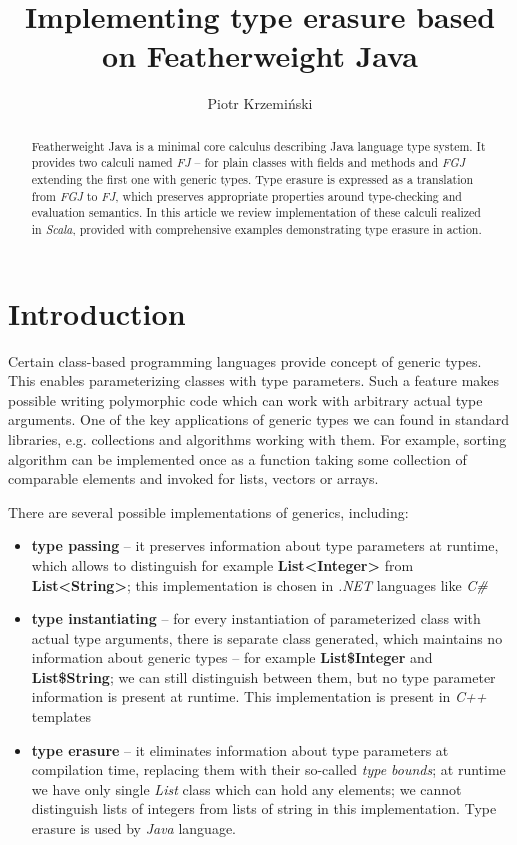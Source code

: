 \documentclass{article}[12pt]
\author{Piotr Krzemiński}
\title{Implementing type erasure based on Featherweight Java}
\date{}
\begin{document}
\maketitle


\begin{abstract}
Featherweight Java is a minimal core calculus describing Java language
type system. It provides two calculi named \emph{FJ} -- for plain
classes with fields and methods and \emph{FGJ} extending the first
one with generic types. Type erasure is expressed as a translation
from \emph{FGJ} to \emph{FJ}, which preserves appropriate properties
around type-checking and evaluation semantics. In this article
we review implementation of these calculi realized in \emph{Scala},
provided with comprehensive examples demonstrating type erasure in
action.
\end{abstract}


\section{Introduction}

Certain class-based programming languages provide concept of generic
types. This enables parameterizing classes with type parameters.
Such a feature makes possible writing polymorphic code which can
work with arbitrary actual type arguments. One of the key applications
of generic types we can found in standard libraries, e.g.
collections and algorithms working with them. For example,
sorting algorithm can be implemented once as a function taking some
collection of comparable elements and invoked for lists, vectors
or arrays.

There are several possible implementations of generics, including:

\begin{itemize}

\item{\textbf{type passing}} -- it preserves information about
  type parameters at runtime, which allows to distinguish
  for example \textbf{List<Integer>} from \textbf{List<String>}; 
  this implementation is chosen in \emph{.NET} languages like
  \emph{C\#}

\item{\textbf{type instantiating}} -- for every instantiation of
  parameterized class with actual type arguments, there is separate
  class generated, which maintains no information about generic
  types -- for example \textbf{List\$Integer} and \textbf{List\$String};
  we can still distinguish between them, but no type parameter
  information is present at runtime. This implementation is present
  in \emph{C++} templates

\item{\textbf{type erasure}} -- it eliminates information about
  type parameters at compilation time, replacing them with their
  so-called \emph{type bounds}; at runtime we have only single
  \emph{List} class which can hold any elements; we cannot
  distinguish lists of integers from lists of string in this
  implementation. Type erasure is used by \emph{Java} language.

\end{itemize}
\end{document}

